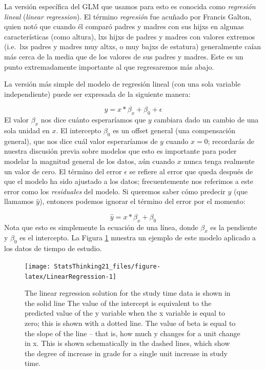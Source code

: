 \documentclass[
  12pt,
]{book}
\begin{document}
La versión específica del GLM que usamos para esto es conocida como \emph{regresión lineal} (\emph{linear regression}). El término \emph{regresión} fue acuñado por Francis Galton, quien notó que cuando él comparó padres y madres con sus hijxs en algunas características (como altura), lxs hijxs de padres y madres con valores extremos (i.e.~lxs padres y madres muy altxs, o muy bajxs de estatura) generalmente caían más cerca de la media que de los valores de sus padres y madres. Este es un punto extremadamente importante al que regresaremos más abajo.

La versión más simple del modelo de regresión lineal (con una sola variable independiente) puede ser expresada de la siguiente manera:

\[
y = x * \beta_x + \beta_0 + \epsilon
\]
El valor \(\beta_x\) nos dice cuánto esperaríamos que \(y\) cambiara dado un cambio de una sola unidad en \(x\). El intercepto \(\beta_0\) es un offset general (una compensación general), que nos dice cuál valor esperaríamos de \(y\) cuando \(x=0\); recordarás de nuestra discusión previa sobre modelos que esto es importante para poder modelar la magnitud general de los datos, aún cuando \(x\) nunca tenga realmente un valor de cero. El término del error \(\epsilon\) se refiere al error que queda después de que el modelo ha sido ajustado a los datos; frecuentemente nos referimos a este error como los \emph{residuales} del modelo. Si queremos saber cómo predecir \(y\) (que llamamos \(\hat{y}\)), entonces podemos ignorar el término del error por el momento:

\[
\hat{y} = x * \beta_x + \beta_0 
\]
Nota que esto es simplemente la ecuación de una línea, donde \(\beta_x\) es la pendiente y \(\beta_0\) es el intercepto. La Figura \ref{fig:LinearRegression} muestra un ejemplo de este modelo aplicado a los datos de tiempo de estudio.

\begin{figure}
\texttt{[image: StatsThinking21\_files/figure-latex/LinearRegression-1]} \caption{The linear regression solution for the study time data is shown in the solid line The value of the intercept is equivalent to the predicted value of the y variable when the x variable is equal to zero; this is shown with a dotted line.  The value of beta is equal to the slope of the line -- that is, how much y changes for a unit change in x.  This is shown schematically in the dashed lines, which show the degree of increase in grade for a single unit increase in study time.}\label{fig:LinearRegression}
\end{figure}
\end{document}
